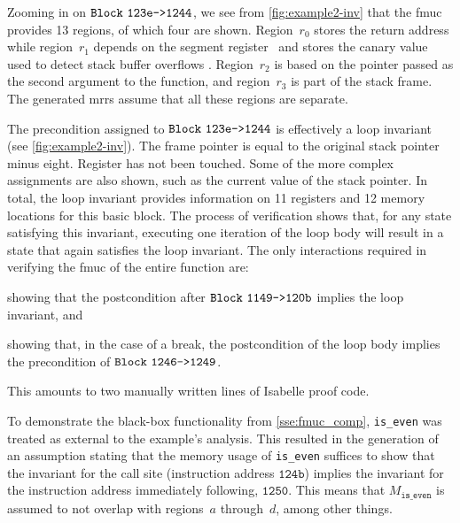 Zooming in on $\texttt{Block}~\mathtt{123e\texttt{->}1244}$, we see from \cref{fig:example2-inv}
that the \ac{fmuc} provides 13 regions, of which four are shown.
Region~$r_0$ stores the return address
while region~$r_1$ depends on the segment register~
and stores the canary value
used to detect stack buffer overflows \autocite{cowan1998stackguard}.%
Region~$r_2$ is based on the pointer passed as the second argument to the function,
and region~$r_3$ is part of the stack frame.
The generated \acp{mrr} assume that all these regions are separate.

The precondition assigned to $\texttt{Block}~\mathtt{123e\texttt{->}1244}$
is effectively a loop invariant (see \cref{fig:example2-inv}).%
The frame pointer %
is equal to the original stack pointer minus eight.%
Register  has not been touched.
Some of the more complex assignments are also shown,
such as the current value of the stack pointer.
In total, the loop invariant provides information
on 11 registers and 12 memory locations for this basic block.%
The process of verification shows that,
for any state satisfying this invariant,
executing one iteration of the loop body
will result in a state that again satisfies the loop invariant.
The only interactions required in verifying the \ac{fmuc} of the entire function are:
\begin{enumerate*}
  \item showing that the postcondition after $\texttt{Block}~\mathtt{1149\texttt{->}120b}$
  implies the loop invariant, and
  \item showing that, in the case of a break, the postcondition of the loop body
  implies the precondition of $\texttt{Block}~\mathtt{1246\texttt{->}1249}$.
\end{enumerate*}
This amounts to two manually written lines of Isabelle proof code.

To demonstrate the black-box functionality from \cref{sse:fmuc_comp},
\lstinline|is_even| was treated as external to the example's analysis.
This resulted in the generation of an assumption
stating that the memory usage of \lstinline|is_even| suffices to show that
the invariant for the call site (instruction address $\mathtt{124b}$)
implies the invariant for the instruction address immediately following,
$\mathtt{1250}$.
This means that $M_\mathtt{is\_even}$
is assumed to not overlap with regions~$a$ through~$d$, among other things.

